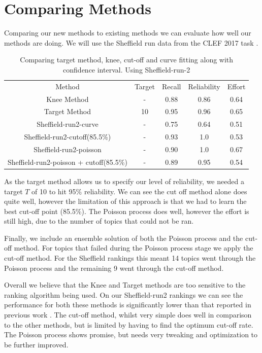\section{Comparing Methods} \label{compMethods}

Comparing our new methods to existing methods we can evaluate how well our methods are doing. We will use the Sheffield run data from the CLEF 2017 task \cite{Kanoulas12017}.

\begin{table}[H]

\centering
\begin{tabular}{|c|c|c|c|c|} 
 \hline
 Method & Target & Recall & Reliability & Effort  \\ 
 Knee Method & - & 0.88 & 0.86 & 0.64 \\
 Target Method & 10 & 0.95 & 0.96 & 0.65 \\
 Sheffield-run2-curve & - & 0.75 & 0.64 & 0.51 \\
 Sheffield-run2-cutoff(85.5\%) & - & 0.93 & 1.0 & 0.53 \\
 Sheffield-run2-poisson & - & 0.90 & 1.0 & 0.67 \\
 Sheffield-run2-poisson + cutoff(85.5\%) & - & 0.89 & 0.95 & 0.54 \\
 \hline
\end{tabular}
\caption{Comparing target method, knee, cut-off and curve fitting along with confidence interval. Using Sheffield-run-2}

\end{table}

As the target method allows us to specify our level of reliability, we needed a target $T$ of 10 to hit 95\% reliability. We can see the cut off method alone does quite well, however the limitation of this approach is that we had to learn the best cut-off point (85.5\%). The Poisson process does well, however the effort is still high, due to the number of topics that could not be ran.

Finally, we include an ensemble solution of both the Poisson process and the cut-off method. For topics that failed during the Poisson process stage we apply the cut-off method. For the Sheffield rankings this meant 14 topics went through the Poisson process and the remaining 9 went through the cut-off method. 

Overall we believe that the Knee and Target methods are too sensitive to the ranking algorithm being used. On our Sheffield-run2 rankings we can see the performance for both these methods is significantly lower than that reported in previous work \cite{Cormack2016}. The cut-off method, whilst very simple does well in comparison to the other methods, but is limited by having to find the optimum cut-off rate. The Poisson process shows promise, but needs very tweaking and optimization to be further improved. 

